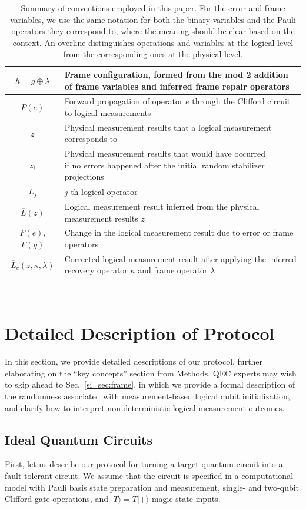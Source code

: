 \begin{table}
\begin{tabular}{|c|l|}
$h=g\oplus\lambda$ & Frame configuration, formed from the mod 2 addition of frame variables and inferred frame repair operators\\\hline
$P(e)$ & Forward propagation of operator $e$ through the Clifford circuit to logical measurements\\\hline
$z$ & Physical measurement results that a logical measurement corresponds to\\\hline
$z_i$ & \makecell{Physical measurement results that would have occurred\\ if no errors happened after the initial random stabilizer projections}\\\hline
$L_j$ & $j$-th logical operator\\\hline
$\overline{L}(z)$ & Logical measurement result inferred from the physical measurement results $z$\\\hline
$\overline{F}(e)$, $\overline{F}(g)$ & Change in the logical measurement result due to error or frame operators\\\hline
$\overline{L}_c(z,\kappa,\lambda)$ & Corrected logical measurement result after applying the inferred recovery operator $\kappa$ and frame operator $\lambda$\\\hline
\end{tabular}\\
\caption{Summary of conventions employed in this paper.
%
For the error and frame variables, we use the same notation for both the binary variables and the Pauli operators they correspond to, where the meaning should be clear based on the context.
%
An overline distinguishes operations and variables at the logical level from the corresponding ones at the physical level.
\label{tab:conventions}}
\end{table}


\section{Detailed Description of Protocol}
\label{sec:formal_description}

In this section, we provide detailed descriptions of our protocol, further elaborating on the ``key concepts'' section from Methods.
%
QEC experts may wish to skip ahead to Sec.~\ref{si_sec:frame}, in which we provide a formal description of the randomness associated with measurement-based logical qubit initialization, and clarify how to interpret non-deterministic logical measurement outcomes.

\subsection{Ideal Quantum Circuits}
First, let us describe our protocol for turning a target quantum circuit into a fault-tolerant circuit.
%
We assume that the circuit is specified in a computational model with Pauli basis state preparation and measurement, single- and two-qubit Clifford gate operations, and $|T\rangle=T|+\rangle$ magic state inputs.

